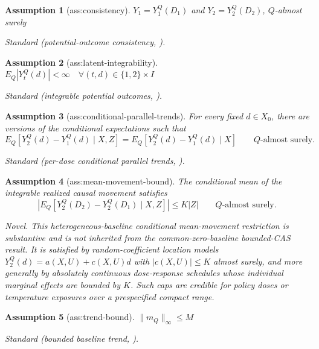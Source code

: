 \documentclass{article}
\newtheorem{assumption}{Assumption}
\begin{document}
\begin{assumption}[ass:consistency]\label{ass:consistency}
\(Y_1=Y_1^Q(D_1)\) and \(Y_2=Y_2^Q(D_2)\), \(Q\)-almost surely
\par\smallskip\noindent\emph{Standard} (potential-outcome consistency, \cite{deChaisemartinDHaultfoeuilleVazquezBare2024NoStayers}).
\end{assumption}

\begin{assumption}[ass:latent-integrability]\label{ass:latent-integrability}
\(E_Q|Y_t^Q(d)|<\infty\quad\forall(t,d)\in\{1,2\}\times I\)
\par\smallskip\noindent\emph{Standard} (integrable potential outcomes, \cite{deChaisemartinDHaultfoeuilleVazquezBare2024NoStayers}).
\end{assumption}

\begin{assumption}[ass:conditional-parallel-trends]\label{ass:conditional-parallel-trends}
For every fixed \(d\in X_0\), there are versions of the conditional expectations such that
\[
E_Q\!\left[Y_2^Q(d)-Y_1^Q(d)\mid X,Z\right]
=E_Q\!\left[Y_2^Q(d)-Y_1^Q(d)\mid X\right]
\qquad Q\text{-almost surely}.
\]
\par\smallskip\noindent\emph{Standard} (per-dose conditional parallel trends, \cite{deChaisemartinDHaultfoeuilleVazquezBare2024NoStayers}).
\end{assumption}

\begin{assumption}[ass:mean-movement-bound]\label{ass:mean-movement-bound}
The conditional mean of the integrable realized causal movement satisfies
\[
\left|E_Q\!\left[Y_2^Q(D_2)-Y_2^Q(D_1)\mid X,Z\right]\right|
\leq K|Z|
\qquad Q\text{-almost surely}.
\]
\par\smallskip\noindent\emph{Novel.} This heterogeneous-baseline conditional mean-movement restriction is substantive and is not inherited from the common-zero-baseline bounded-CAS result. It is satisfied by random-coefficient location models \(Y_2^Q(d)=a(X,U)+c(X,U)d\) with \(|c(X,U)|\le K\) almost surely, and more generally by absolutely continuous dose-response schedules whose individual marginal effects are bounded by \(K\). Such caps are credible for policy doses or temperature exposures over a prespecified compact range.
\end{assumption}

\begin{assumption}[ass:trend-bound]\label{ass:trend-bound}
\(\|m_Q\|_\infty\le M\)
\par\smallskip\noindent\emph{Standard} (bounded baseline trend, \cite{ArmstrongKolesar2018OptimalInference}).
\end{assumption}
\end{document}
